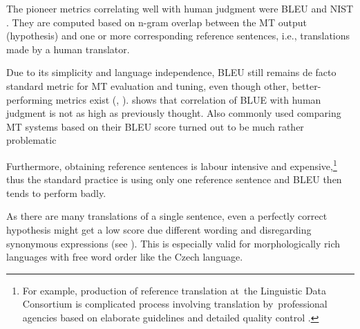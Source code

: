 {The pioneer metrics correlating well with human judgment were BLEU \cite{bleu} 
and NIST \citep{nist}. They are computed based on n-gram overlap between the 
MT output (hypothesis) and one or more corresponding reference sentences, i.e., 
translations made by a human translator.

Due to its simplicity and language independence, BLEU still remains de facto
standard metric for MT evaluation and tuning, even though other, 
better-performing metrics exist (\cite{wmt13-metrics}, \cite{wmt14}). 
\cite{callison2006re} shows that correlation of BLUE with human judgment is 
not as high as previously thought. Also commonly used comparing MT systems
based on their BLEU score turned out to be much rather problematic \cite{tenMattPost}


Furthermore, obtaining reference sentences is labour intensive and 
expensive,\footnote{For example, production of reference translation  at~the 
Linguistic Data Consortium is complicated process involving translation 
by~professional agencies based on elaborate guidelines and detailed quality 
control \cite{strassel}.} thus the standard practice is using only one 
reference sentence and BLEU then tends to perform badly. 

As there are many translations of a single sentence, even a perfectly correct 
hypothesis might get a low score due different wording and disregarding 
synonymous expressions (see ). This is 
especially valid for morphologically rich languages with free word order 
like the Czech language. \cite{bojar-tackling-sparse-data}


}
